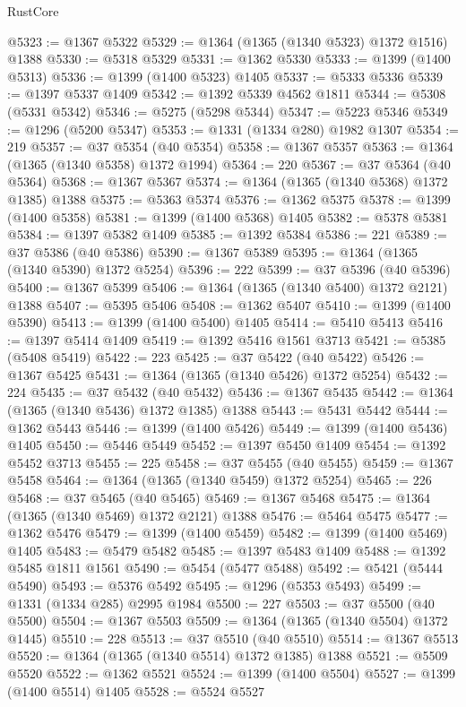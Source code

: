 \begin{lexlean}{RustCore}
\begin{coremodule}
@5323 := @1367 @5322
@5329 := @1364 (@1365 (@1340 @5323) @1372 @1516) @1388
@5330 := @5318 @5329
@5331 := @1362 @5330
@5333 := @1399 (@1400 @5313)
@5336 := @1399 (@1400 @5323) @1405
@5337 := @5333 @5336
@5339 := @1397 @5337 @1409
@5342 := @1392 @5339 @4562 @1811
@5344 := @5308 (@5331 @5342)
@5346 := @5275 (@5298 @5344)
@5347 := @5223 @5346
@5349 := @1296 (@5200 @5347)
@5353 := @1331 (@1334 @280) @1982 @1307
@5354 := 219
@5357 := @37 @5354 (@40 @5354)
@5358 := @1367 @5357
@5363 := @1364 (@1365 (@1340 @5358) @1372 @1994)
@5364 := 220
@5367 := @37 @5364 (@40 @5364)
@5368 := @1367 @5367
@5374 := @1364 (@1365 (@1340 @5368) @1372 @1385) @1388
@5375 := @5363 @5374
@5376 := @1362 @5375
@5378 := @1399 (@1400 @5358)
@5381 := @1399 (@1400 @5368) @1405
@5382 := @5378 @5381
@5384 := @1397 @5382 @1409
@5385 := @1392 @5384
@5386 := 221
@5389 := @37 @5386 (@40 @5386)
@5390 := @1367 @5389
@5395 := @1364 (@1365 (@1340 @5390) @1372 @5254)
@5396 := 222
@5399 := @37 @5396 (@40 @5396)
@5400 := @1367 @5399
@5406 := @1364 (@1365 (@1340 @5400) @1372 @2121) @1388
@5407 := @5395 @5406
@5408 := @1362 @5407
@5410 := @1399 (@1400 @5390)
@5413 := @1399 (@1400 @5400) @1405
@5414 := @5410 @5413
@5416 := @1397 @5414 @1409
@5419 := @1392 @5416 @1561 @3713
@5421 := @5385 (@5408 @5419)
@5422 := 223
@5425 := @37 @5422 (@40 @5422)
@5426 := @1367 @5425
@5431 := @1364 (@1365 (@1340 @5426) @1372 @5254)
@5432 := 224
@5435 := @37 @5432 (@40 @5432)
@5436 := @1367 @5435
@5442 := @1364 (@1365 (@1340 @5436) @1372 @1385) @1388
@5443 := @5431 @5442
@5444 := @1362 @5443
@5446 := @1399 (@1400 @5426)
@5449 := @1399 (@1400 @5436) @1405
@5450 := @5446 @5449
@5452 := @1397 @5450 @1409
@5454 := @1392 @5452 @3713
@5455 := 225
@5458 := @37 @5455 (@40 @5455)
@5459 := @1367 @5458
@5464 := @1364 (@1365 (@1340 @5459) @1372 @5254)
@5465 := 226
@5468 := @37 @5465 (@40 @5465)
@5469 := @1367 @5468
@5475 := @1364 (@1365 (@1340 @5469) @1372 @2121) @1388
@5476 := @5464 @5475
@5477 := @1362 @5476
@5479 := @1399 (@1400 @5459)
@5482 := @1399 (@1400 @5469) @1405
@5483 := @5479 @5482
@5485 := @1397 @5483 @1409
@5488 := @1392 @5485 @1811 @1561
@5490 := @5454 (@5477 @5488)
@5492 := @5421 (@5444 @5490)
@5493 := @5376 @5492
@5495 := @1296 (@5353 @5493)
@5499 := @1331 (@1334 @285) @2995 @1984
@5500 := 227
@5503 := @37 @5500 (@40 @5500)
@5504 := @1367 @5503
@5509 := @1364 (@1365 (@1340 @5504) @1372 @1445)
@5510 := 228
@5513 := @37 @5510 (@40 @5510)
@5514 := @1367 @5513
@5520 := @1364 (@1365 (@1340 @5514) @1372 @1385) @1388
@5521 := @5509 @5520
@5522 := @1362 @5521
@5524 := @1399 (@1400 @5504)
@5527 := @1399 (@1400 @5514) @1405
@5528 := @5524 @5527

\end{coremodule}
\end{lexlean}
